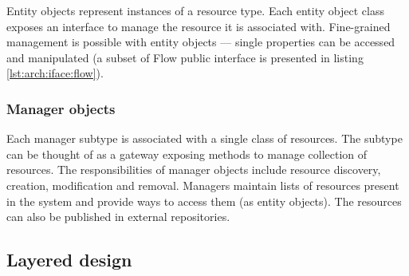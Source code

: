\documentclass[11pt]{book}
\begin{document}
          Entity objects represent instances of a resource type. Each entity object class exposes an interface to manage
          the resource it is associated with. Fine-grained management is possible with entity objects --- single
          properties can be accessed and manipulated (a subset of Flow public interface is presented in listing
          \ref{lst:arch:iface:flow}). \\

          \noindent
          \begin{minipage}{\textwidth}
            
          \end{minipage}


        \subsubsection{Manager objects}

          Each manager subtype is associated with a single class of resources. The subtype can be thought of as a
          gateway exposing methods to manage collection of resources. The responsibilities of manager objects include
          resource discovery, creation, modification and removal. Managers maintain lists of resources present in the
          system and provide ways to access them (as entity objects). The resources can also be published in external
          repositories. \\

          \noindent
          \begin{minipage}{\textwidth}
            
          \end{minipage}



      \subsection{Layered design}
\end{document}
